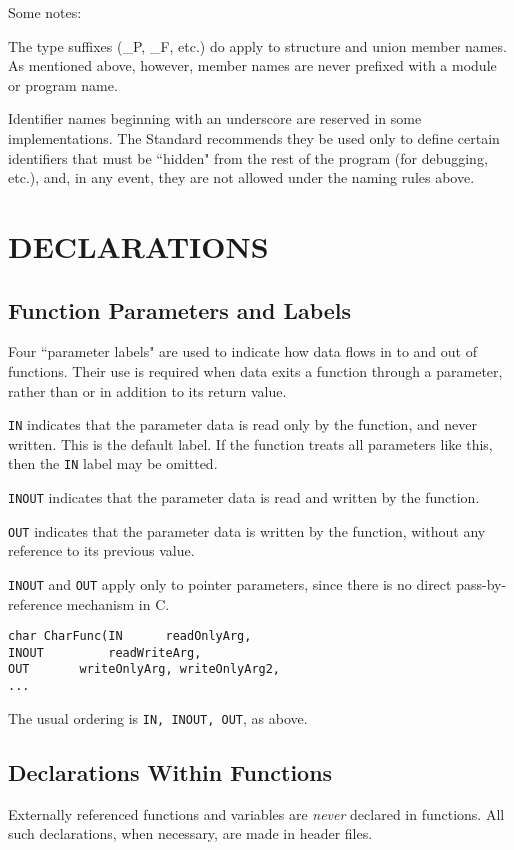 Some notes:

The type suffixes (\_P, \_F, etc.) do apply to structure and union
member names.  As mentioned above, however, member names are never
prefixed with a module or program name.

Identifier names beginning with an underscore are reserved in some
implementations.  The Standard recommends they be used only to define
certain identifiers that must be ``hidden" from the rest of the
program (for debugging, etc.), and, in any event, they are not allowed
under the naming rules above.

\section {DECLARATIONS}

\subsection{Function Parameters and Labels}
Four ``parameter labels" are used to indicate how data flows in to and
out of functions.  Their use is required when data exits a function
through a parameter, rather than or in addition to its return value.

{\tt IN} indicates that the parameter data is read only by the
function, and never written.  This is the default label.  If the
function treats all parameters like this, then the {\tt IN} label may
be omitted.

{\tt INOUT} indicates that the parameter data is read and written by the
function.

{\tt OUT} indicates that the parameter data is written by the function, without
any reference to its previous value.

{\tt INOUT} and {\tt OUT} apply only to pointer parameters, since
there is no direct pass-by- reference mechanism in C.

\begin{verbatim}
char CharFunc(IN      readOnlyArg,
INOUT         readWriteArg,
OUT       writeOnlyArg, writeOnlyArg2,
...
\end{verbatim}

The usual ordering is {\tt IN, INOUT, OUT}, as above.

\subsection{Declarations Within Functions}

Externally referenced functions and variables are {\em never} declared
in functions.  All such declarations, when necessary, are made in
header files.

